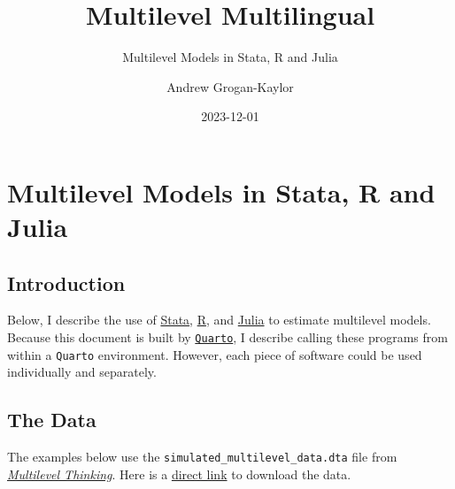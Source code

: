 \documentclass[
  letterpaper,
  DIV=11,
  numbers=noendperiod]{scrreprt}
\title{Multilevel Multilingual}
\subtitle{Multilevel Models in Stata, R and Julia}
\author{Andrew Grogan-Kaylor}
\date{2023-12-01}
\renewcommand*\contentsname{Table of contents}
\newcommand\contentsname{Table of contents}
\begin{document}
\maketitle
\ifdefined\Shaded\renewenvironment{Shaded}{\begin{tcolorbox}[frame hidden, breakable, sharp corners, interior hidden, boxrule=0pt, borderline west={3pt}{0pt}{shadecolor}, enhanced]}{\end{tcolorbox}}\fi

\renewcommand*\contentsname{Table of contents}
{
\hypersetup{linkcolor=}
\setcounter{tocdepth}{2}
\tableofcontents
}
\listoffigures
\listoftables
{}

\hypertarget{multilevel-models-in-stata-r-and-julia}{%
\chapter{Multilevel Models in Stata, R and
Julia}\label{multilevel-models-in-stata-r-and-julia}}

\hypertarget{introduction}{%
\section{Introduction}\label{introduction}}

Below, I describe the use of \href{https://www.stata.com/}{Stata},
\href{https://www.r-project.org/}{R}, and
\href{https://www.julialang.org/}{Julia} to estimate multilevel models.
Because this document is built by
\href{https://quarto.org/}{\texttt{Quarto}}, I describe calling these
programs from within a \texttt{Quarto} environment. However, each piece
of software could be used individually and separately.

\hypertarget{the-data}{%
\section{The Data}\label{the-data}}

The examples below use the \texttt{simulated\_multilevel\_data.dta} file
from
\href{https://agrogan1.github.io/multilevel-thinking/simulated-multi-country-data.html}{\emph{Multilevel
Thinking}}. Here is a
\href{https://github.com/agrogan1/multilevel-multilingual/raw/main/simulated_multilevel_data.dta}{direct
link} to download the data.
\end{document}
